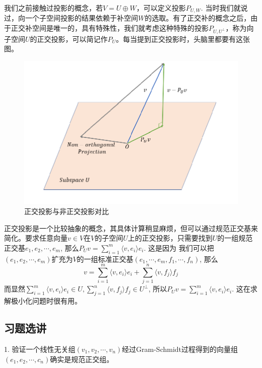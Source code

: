 \documentclass[hyperref,]{ctexart}
\begin{document}
我们之前接触过投影的概念，若\(V = U\oplus W\)，可以定义投影\(P_{U,W}\).
当时我们就说过，向一个子空间投影的结果依赖于补空间\(W\)的选取。有了正交补的概念之后，由于正交补空间是唯一的，具有特殊性，我们就考虑这种特殊的投影\(P_{U,U^\perp}\)，称为向子空间\(U\)的正交投影，可以简记作\(P_U\)。每当提到正交投影时，头脑里都要有这张图。

\begin{figure}
\centering
\includegraphics{proj.png}
\caption{正交投影与非正交投影对比}
\end{figure}

正交投影是一个比较抽象的概念，其具体计算稍显麻烦，但可以通过规范正交基来简化。要求任意向量\(v\in V\)在\(V\)的子空间\(U\)上的正交投影，只需要找到\(U\)的一组规范正交基\(e_1,e_2,\cdots,e_m\),
那么\(P_Uv = \sum_{i=1}^m\langle v,e_i\rangle e_i\). 这是因为
我们可以把\((e_1,e_2,\cdots,e_m)\)扩充为\(V\)的一组标准正交基\((e_1,\cdots,e_m,f_1,\cdots,f_n)\),
那么
\[v = \sum_{i=1}^m \langle v, e_i\rangle e_i +\sum_{j=1}^n \langle v,f_j\rangle f_j\]
而显然\(\sum_{i=1}^m \langle v, e_i\rangle e_i\in U, \sum_{j=1}^n \langle v,f_j\rangle f_j\in U^\perp\),
所以\(P_Uv = \sum_{i=1}^m\langle v,e_i\rangle e_i\).
这在求解极小化问题时很有用。

\subsection{习题选讲}\label{ux4e60ux9898ux9009ux8bb2-2}

\noindent{} 1.
验证一个线性无关组\((v_1,v_2,\cdots,v_n)\)经过Gram-Schmidt过程得到的向量组\((e_1,e_2,\cdots,c_n)\)确实是规范正交组。

\smallskip
\end{document}
